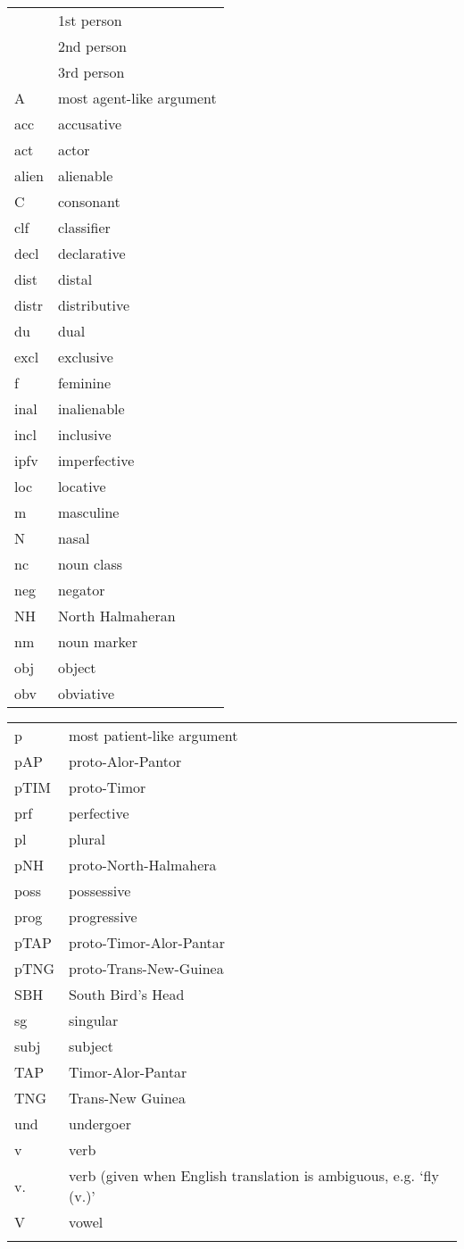 \begin{tabular}{>{\sc}ll}
  1 & 1st person\\
2 & 2nd person\\
3 & 3rd person\\
A & most agent-like argument\\
acc & accusative\\
act & actor\\
alien & alienable \\
C & consonant \\
clf & classifier\\
decl & declarative\\
dist & distal\\
distr & distributive\\
du & dual\\
excl & exclusive\\
f & feminine\\
inal & inalienable\\
incl & inclusive\\
ipfv & imperfective\\
loc & locative\\
m & masculine\\
N & nasal\\
nc & noun class\\
neg & negator\\
NH & North Halmaheran\\
nm & noun marker\\
obj & object\\
obv & obviative\\
\end{tabular}
\begin{tabular}{>{\sc}lp{3cm}}
p & most patient-like argument\\
pAP & proto-Alor-Pantor\\
pTIM & proto-Timor\\
prf & perfective\\
pl & plural\\
pNH & proto-North-Halmahera\\
poss & possessive\\
prog & progressive\\
pTAP & proto-Timor-Alor-Pantar\\
pTNG & proto-Trans-New-Guinea\\
SBH & South Bird’s Head\\
sg & singular\\
subj & subject\\
TAP & Timor-Alor-Pantar\\
TNG & Trans-New Guinea\\
und & undergoer\\
v & verb\\
v. & verb (given when English translation is ambiguous, e.g. ‘fly (v.)’\\
V & vowel \\
\\
\end{tabular}